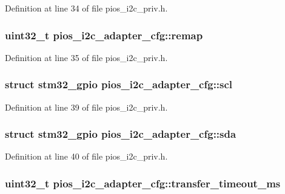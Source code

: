 \-Definition at line 34 of file pios\-\_\-i2c\-\_\-priv.\-h.

\hypertarget{structpios__i2c__adapter__cfg_a64d54eb4eb6d9aa0111e3f677afc37ba}{
\subsubsection[{remap}]{\setlength{\rightskip}{0pt plus 5cm}uint32\-\_\-t {\bf pios\-\_\-i2c\-\_\-adapter\-\_\-cfg\-::remap}}}\label{structpios__i2c__adapter__cfg_a64d54eb4eb6d9aa0111e3f677afc37ba}


\-Definition at line 35 of file pios\-\_\-i2c\-\_\-priv.\-h.

\hypertarget{structpios__i2c__adapter__cfg_a900bd610a99f0518997e6e2564ef15c7}{
\subsubsection[{scl}]{\setlength{\rightskip}{0pt plus 5cm}struct {\bf stm32\-\_\-gpio} {\bf pios\-\_\-i2c\-\_\-adapter\-\_\-cfg\-::scl}}}\label{structpios__i2c__adapter__cfg_a900bd610a99f0518997e6e2564ef15c7}


\-Definition at line 39 of file pios\-\_\-i2c\-\_\-priv.\-h.

\hypertarget{structpios__i2c__adapter__cfg_a429bb7d5f0918ade96becff15a633875}{
\subsubsection[{sda}]{\setlength{\rightskip}{0pt plus 5cm}struct {\bf stm32\-\_\-gpio} {\bf pios\-\_\-i2c\-\_\-adapter\-\_\-cfg\-::sda}}}\label{structpios__i2c__adapter__cfg_a429bb7d5f0918ade96becff15a633875}


\-Definition at line 40 of file pios\-\_\-i2c\-\_\-priv.\-h.

\hypertarget{structpios__i2c__adapter__cfg_a97b5a8ff68686286ba5f86dda188eb01}{
\subsubsection[{transfer\-\_\-timeout\-\_\-ms}]{\setlength{\rightskip}{0pt plus 5cm}uint32\-\_\-t {\bf pios\-\_\-i2c\-\_\-adapter\-\_\-cfg\-::transfer\-\_\-timeout\-\_\-ms}}}\label{structpios__i2c__adapter__cfg_a97b5a8ff68686286ba5f86dda188eb01}



